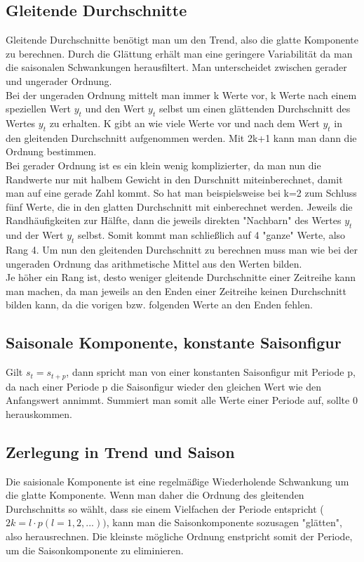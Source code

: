 \documentclass[a4paper]{article}
\begin{document}
\subsection{Gleitende Durchschnitte}
Gleitende Durchschnitte benötigt man um den Trend, also die glatte Komponente zu berechnen. Durch die Glättung erhält man eine geringere Variabilität da man die saisonalen Schwankungen herausfiltert.
Man unterscheidet zwischen gerader und ungerader Ordnung.\\ 
Bei der ungeraden Ordnung mittelt man immer k Werte vor, k Werte nach einem speziellen Wert $y_t$ und den Wert $y_t$ selbst um einen glättenden Durchschnitt des Wertes $y_t$ zu erhalten. K gibt an wie viele Werte vor und nach dem Wert $y_t$ in den gleitenden Durchschnitt aufgenommen werden. Mit 2k+1 kann man dann die Ordnung bestimmen.
\\
Bei gerader Ordnung ist es ein klein wenig komplizierter, da man nun die Randwerte nur mit halbem Gewicht in den Durschnitt miteinberechnet, damit man auf eine gerade Zahl kommt. So hat man beispielsweise bei k=2 zum Schluss fünf Werte, die in den glatten Durchschnitt mit einberechnet werden. Jeweils die Randhäufigkeiten zur Hälfte, dann die jeweils direkten "Nachbarn" des Wertes $y_t$ und der Wert $y_t$ selbst. Somit kommt man schließlich auf 4 "ganze" Werte, also Rang 4. Um nun den gleitenden Durchschnitt zu berechnen muss man wie bei der ungeraden Ordnung das arithmetische Mittel aus den Werten bilden.\\
Je höher ein Rang ist, desto weniger gleitende Durchschnitte einer Zeitreihe kann man machen, da man jeweils an den Enden einer Zeitreihe keinen Durchschnitt bilden kann, da die vorigen bzw. folgenden Werte an den Enden fehlen.


\subsection{Saisonale Komponente, konstante Saisonfigur}
Gilt $s_t=s_{t+p}$, dann spricht man von einer konstanten Saisonfigur mit Periode p, da nach einer Periode p die Saisonfigur wieder den gleichen Wert wie den Anfangswert annimmt. Summiert man somit alle Werte einer Periode auf, sollte 0 herauskommen.

\subsection{Zerlegung in Trend und Saison}
Die saisionale Komponente ist eine regelmäßige Wiederholende Schwankung um die glatte Komponente. Wenn man daher die Ordnung des gleitenden Durchschnitts so wählt, dass sie einem Vielfachen der Periode entspricht ($2k=l\cdotp p (l=1,2,...))$, kann man die Saisonkomponente sozusagen "glätten", also herausrechnen.
Die kleinste mögliche Ordnung enstpricht somit der Periode, um die Saisonkomponente zu eliminieren.
\end{document}
